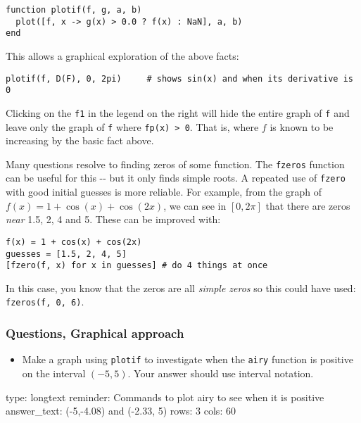 \documentclass[12pt]{article}
\begin{document}
\begin{verbatim}
function plotif(f, g, a, b)
  plot([f, x -> g(x) > 0.0 ? f(x) : NaN], a, b)
end
\end{verbatim}
This allows a graphical exploration of the above facts:



\begin{verbatim}
plotif(f, D(F), 0, 2pi)     # shows sin(x) and when its derivative is 0
\end{verbatim}
Clicking on the \texttt{f1} in the legend on the right will hide the
entire graph of \texttt{f} and leave only the graph of \texttt{f} where
\texttt{fp(x) \textgreater{} 0}. That is, where $f$ is known to be
increasing by the basic fact above.



Many questions resolve to finding zeros of some function. The
\texttt{fzeros} function can be useful for this -{}- but it only finds
simple roots. A repeated use of \texttt{fzero} with good initial guesses
is more reliable. For example, from the graph of
$f(x) = 1 + \cos(x) + \cos(2x)$, we can see in $[0,2\pi]$ that there are
zeros \emph{near} 1.5, 2, 4 and 5. These can be improved with:



\begin{verbatim}
f(x) = 1 + cos(x) + cos(2x)
guesses = [1.5, 2, 4, 5]
[fzero(f, x) for x in guesses] # do 4 things at once
\end{verbatim}
In this case, you know that the zeros are all \emph{simple zeros} so
this could have used: \texttt{fzeros(f, 0, 6)}.

\subsubsection{Questions, Graphical approach}

\begin{itemize}
\itemsep1pt\parskip0pt
\item
  Make a graph using \texttt{plotif} to investigate when the
  \texttt{airy} function is positive on the interval $(-5,5)$. Your
  answer should use interval notation.
\end{itemize}

\begin{answer}
type: longtext
reminder: Commands to plot airy to see when it is positive
answer_text: (-5,-4.08) and (-2.33, 5) 
rows: 3
cols: 60
\end{answer}
\end{document}
